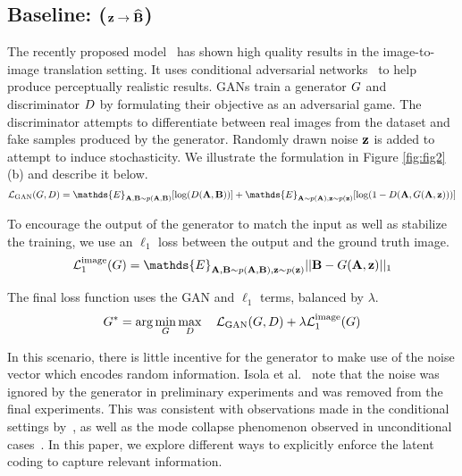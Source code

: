 \subsection{Baseline: \ppn ($\mathbf{z} \rightarrow \widehat{\mathbf{B}}$)}
The recently proposed \pp model~\citep{isola2016image} has shown high quality results in the image-to-image translation setting.
It uses conditional adversarial networks~\citep{goodfellow2014generative,mirza2014conditional} to help produce perceptually realistic results. GANs train a generator $G$ and discriminator $D$ by formulating their objective as an adversarial game. The discriminator attempts to differentiate between real images from the dataset and fake samples produced by the generator. Randomly drawn noise $\mathbf{z}$ is added to attempt to induce stochasticity.
We illustrate the formulation in Figure \ref{fig:fig2}(b) and describe it below.
\begin{equation}
\mathcal{L}_{\text{GAN}}(\G,\D) = \mathds{E}_{\A,\B\sim p(\A,\B)}[\log(\D(\A,\B))] + \mathds{E}_{\A\sim p(\A),\z\sim p(\z)}[ \log(1-\D(\A,\G(\A,\z)))]
\label{eqn:Lgan}
\end{equation}

To encourage the output of the generator to match the input as well as stabilize the training, we use an $\ell_1$ loss between the output and the ground truth image.
\begin{equation}
\mathcal{L}_{1}^{\text{image}}(\G) = \mathds{E}_{\A,\B\sim p(\A,\B),\z\sim p(\z)} ||\B - \G(\A,\z) ||_1
\label{eqn:L1}
\end{equation}

The final loss function uses the GAN and $\ell_1$ terms, balanced by $\lambda$. 
\begin{equation}
G^{*} = \arg\min_{G} \max_{D} \quad \mathcal{L}_{\text{GAN}}(G,D) + \lambda \mathcal{L}_1^{\text{image}}(G)
\end{equation}

In this scenario, there is little incentive for the generator to make use of the noise vector which encodes random information.
Isola et al.~\citep{isola2016image} note that the noise was ignored by the generator in preliminary experiments and was removed from the final experiments.
This was consistent with observations made in the conditional settings by~\citep{pathakCVPR16context,mathieu2015deep}, as well as the mode collapse phenomenon observed in unconditional cases~\citep{salimans2016improved,goodfellow2016nips}.
In this paper, we explore different ways to explicitly enforce
the latent coding to
capture relevant information.

